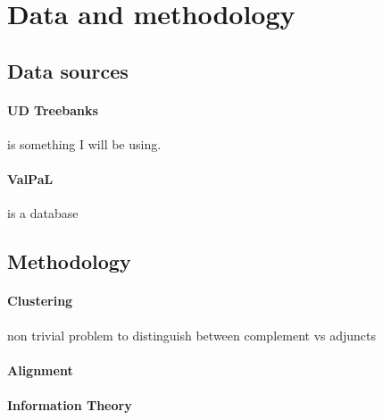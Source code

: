 \section{Data and methodology}

\subsection{Data sources}

\paragraph{\textbf{UD Treebanks}} \cite{universaldep} is something I will be using.
\paragraph{\textbf{ValPaL}} \citep{valpal} is a database


\subsection{Methodology}


\paragraph{Clustering}

non trivial problem to distinguish between complement vs adjuncts

\paragraph{Alignment}
\paragraph{Information Theory}